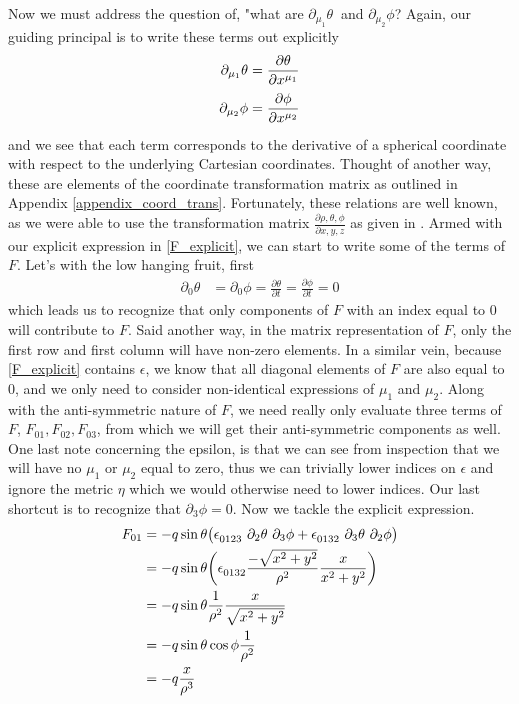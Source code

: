 Now we must address the question of, "what are $ \partial_{\mu_1} \theta \ $ and $\partial_{\mu_2} \phi$? Again, our guiding principal is to write these terms out explicitly 
%
\begin{align}
\partial_{\mu_1} \theta &= \frac{\partial  \theta}{\partial  x\indices{^{\mu_1}}} \\ \label{F_explicit}
\partial_{\mu_2} \phi &= \frac{\partial  \phi}{\partial  x\indices{^{\mu_2}}} 
\end{align} 
%
and we see that each term corresponds to the derivative of a spherical coordinate with respect to the underlying Cartesian coordinates. Thought of another way, these are elements of the coordinate transformation matrix as outlined in Appendix \ref{appendix_coord_trans}. Fortunately, these relations are well known, as we were able to use the transformation matrix $\frac{\partial{\rho, \theta, \phi}}{\partial{x, y, z}}$ as given in \cite{Wiki:1}. Armed with our explicit expression in \ref{F_explicit}, we can start to write some of the terms of $F$. Let's with the low hanging fruit, first
%
\begin{align}
	\partial_{0} \theta &=\partial_{0} \phi = \frac{\partial  \theta}{\partial  t} = \frac{\partial  \phi}{\partial  t} = 0
\end{align} 
%
which leads us to recognize that only components of $F$ with an index equal to $0$ will contribute to $F$. Said another way, in the matrix representation of $F$, only the first row and first column will have non-zero elements. In a similar vein, because \ref{F_explicit} contains $\epsilon$, we know that all diagonal elements of $F$ are also equal to $0$, and we only need to consider non-identical expressions of $\mu_1$ and $\mu_2$. Along with the anti-symmetric nature of $F$, we need really only evaluate three terms of $F$, $F_{01}, F_{02}, F_{03}$, from which we will get their anti-symmetric components as well. One last note concerning the epsilon, is that we can see from inspection that we will have no $\mu_1$ or $\mu_2$ equal to zero, thus we can trivially lower indices on $\epsilon$ and ignore the metric $\eta$ which we would otherwise need to lower indices. Our last shortcut is to recognize that $\partial_3 \phi = 0$. Now we tackle the explicit expression.
%
\begin{align}
	F_{0 1} &= - q \sin{\theta} \big( \epsilon\indices{_{0123}} \ \partial_{2} \theta \ \partial_{3} \phi +  \epsilon\indices{_{0132}} \ \partial_{3} \theta \ \partial_{2} \phi \big) \\
	&= - q \sin{\theta} \bigg( \epsilon\indices{_{0132}} \frac{-\sqrt{x^2 + y^2}}{\rho^2} \frac{x}{x^2 + y^2} \bigg) \\
	&= - q \sin{\theta} \frac{1}{\rho^2} \frac{x}{\sqrt{x^2 + y^2}} \\
	&= - q \sin{\theta} \cos{\phi} \frac{1}{\rho^2} \\
	&= - q \frac{x}{\rho^3}
\end{align} 
